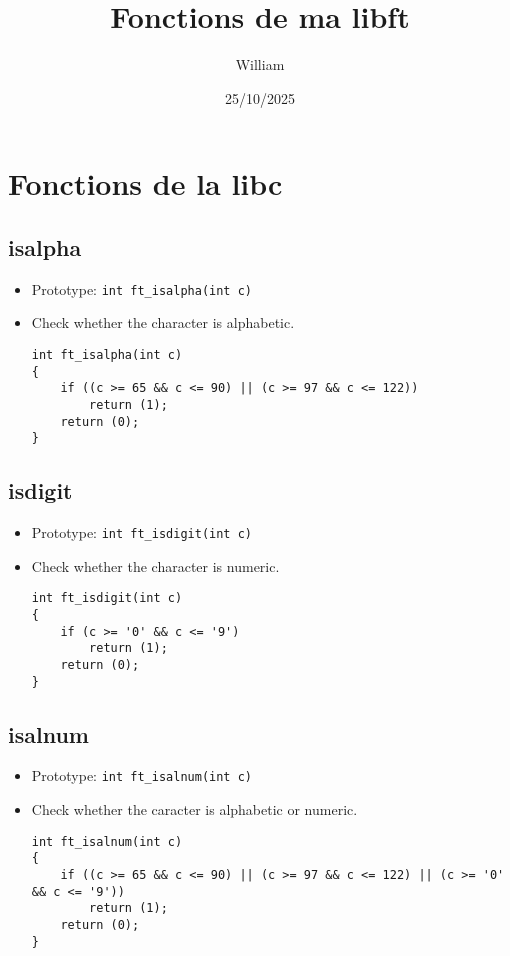 \documentclass{article}
\title{Fonctions de ma libft}
\author{William}
\date{25/10/2025}
\begin{document}
	\maketitle
	\tableofcontents
	\section{Fonctions de la libc}
		\subsection{isalpha}
			\begin{itemize}[label=$\rightarrow$]
				\item Prototype: \texttt{int	ft\_isalpha(int c)}
				\item Check whether the character is alphabetic.
				\begin{verbatim}
int	ft_isalpha(int c)
{
	if ((c >= 65 && c <= 90) || (c >= 97 && c <= 122))
		return (1);
	return (0);
}
				\end{verbatim}
			\end{itemize}
		
		\subsection{isdigit}
			\begin{itemize}[label=$\rightarrow$]
				\item Prototype: \texttt{int ft\_isdigit(int c)}
				\item Check whether the character is numeric.
				\begin{verbatim}
int	ft_isdigit(int c)
{
	if (c >= '0' && c <= '9')
		return (1);
	return (0);
}
				\end{verbatim}
			\end{itemize}
		
		\subsection{isalnum}
			\begin{itemize}[label=$\rightarrow$]
				\item Prototype: \texttt{int ft\_isalnum(int c)
}
				\item Check whether the caracter is alphabetic or numeric.
				\begin{verbatim}
int	ft_isalnum(int c)
{
	if ((c >= 65 && c <= 90) || (c >= 97 && c <= 122) || (c >= '0' && c <= '9'))
		return (1);
	return (0);
}
				\end{verbatim}
			\end{itemize}
		
\end{document}
